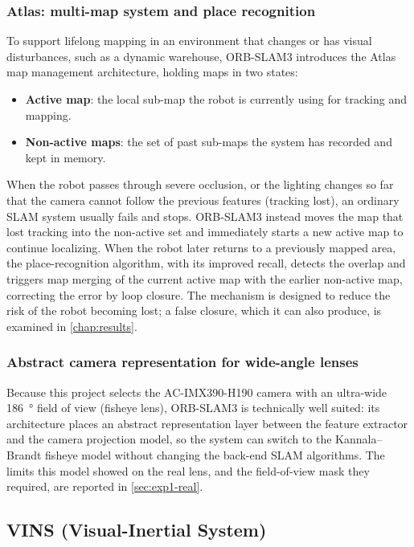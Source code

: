 \subsubsection{Atlas: multi-map system and place recognition}

To support lifelong mapping in an environment that changes or has visual
disturbances, such as a dynamic warehouse, ORB-SLAM3 introduces the Atlas map
management architecture, holding maps in two states:

\begin{itemize}[leftmargin=2em]
  \item \textbf{Active map}: the local sub-map the robot is currently using for
    tracking and mapping.
  \item \textbf{Non-active maps}: the set of past sub-maps the system has
    recorded and kept in memory.
\end{itemize}

When the robot passes through severe occlusion, or the lighting changes so far
that the camera cannot follow the previous features (tracking lost), an ordinary
SLAM system usually fails and stops. ORB-SLAM3 instead moves the map that lost
tracking into the non-active set and immediately starts a new active map to
continue localizing. When the robot later returns to a previously mapped area,
the place-recognition algorithm, with its improved recall, detects the overlap
and triggers map merging of the current active map with the earlier non-active
map, correcting the error by loop closure. The mechanism is designed to reduce
the risk of the robot becoming lost; a false closure, which it can also
produce, is examined in \cref{chap:results}.

\subsubsection{Abstract camera representation for wide-angle lenses}

Because this project selects the AC-IMX390-H190 camera with an ultra-wide
\SI{186}{\degree} field of view (fisheye lens), ORB-SLAM3 is technically well
suited: its architecture places an abstract representation layer between the
feature extractor and the camera projection model, so the system can switch to
the Kannala--Brandt fisheye model without changing the back-end SLAM
algorithms. The limits this model showed on the real lens, and the field-of-view
mask they required, are reported in \cref{sec:exp1-real}.

\subsection{VINS (Visual-Inertial System)}
\label{sec:theory-vins}

